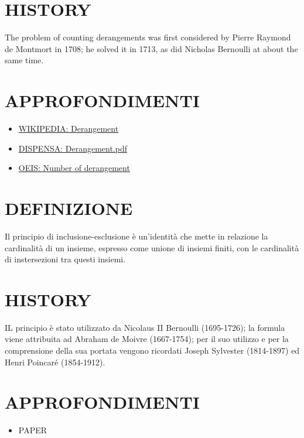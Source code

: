 \section{HISTORY}
The problem of counting derangements was first considered by Pierre Raymond de Montmort in 1708; he solved it in 1713, as did
Nicholas Bernoulli at about the same time. \cite{derangement}

\section{APPROFONDIMENTI}
\begin{itemize}
 \item \href{https://en.wikipedia.org/wiki/Derangement}{WIKIPEDIA: Derangement}
 \item \href{./pdf/DERANGEMENT/derangementLucchini.pdf}{DISPENSA: Derangement.pdf}
 \item \href{http://oeis.org/wiki/Number_of_derangements}{OEIS: Number of derangement}
\end{itemize}




\section{DEFINIZIONE}
Il principio di inclusione-esclusione è un'identità che mette in relazione la cardinalità di un insieme, espresso come unione di insiemi finiti,
con le cardinalità di instersezioni tra questi insiemi.

\section{HISTORY}
IL principio è stato utilizzato da Nicolaus II Bernoulli (1695-1726); la formula viene attribuita ad Abraham de Moivre (1667-1754);
per il suo utilizzo e per la comprensione della sua portata vengono ricordati Joseph Sylvester (1814-1897) ed Henri Poincaré (1854-1912). 

\section{APPROFONDIMENTI}
\begin{itemize}
 \item PAPER \cite{pinclescl}
\end{itemize}



